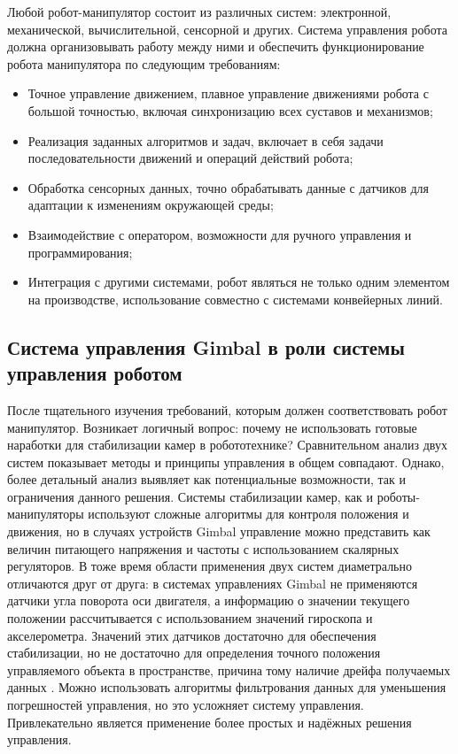 Любой робот-манипулятор состоит из различных систем: электронной, механической, вычислительной, сенсорной и других. Система управления робота должна организовывать работу между ними и обеспечить функционирование робота манипулятора по следующим требованиям:
\begin{itemize}
    \item Точное управление движением, плавное управление движениями робота с
        большой точностью, включая синхронизацию всех суставов и механизмов;

    \item Реализация заданных алгоритмов и задач, включает в себя задачи
        последовательности движений и операций действий робота;

    \item Обработка сенсорных данных, точно обрабатывать данные с датчиков для
        адаптации к изменениям окружающей среды;

    \item Взаимодействие с оператором, возможности для ручного управления и
        программирования;

    \item Интеграция с другими системами, робот являться не только одним
        элементом на производстве, использование совместно с системами конвейерных
        линий.
\end{itemize}

\subsection{Система управления Gimbal в роли системы управления роботом}

После тщательного изучения требований, которым должен соответствовать робот манипулятор. Возникает логичный вопрос: почему не использовать готовые наработки для стабилизации камер в робототехнике? Сравнительном анализ двух систем показывает методы и принципы управления в общем совпадают. Однако, более детальный анализ выявляет как потенциальные возможности, так и ограничения данного решения. Системы стабилизации камер, как и роботы-манипуляторы используют сложные алгоритмы для контроля положения и движения, но в случаях устройств Gimbal управление можно представить как величин питающего напряжения и частоты с использованием скалярных регуляторов. \citep{Altan2020} В тоже время области применения двух систем диаметрально отличаются друг от друга: в системах управлениях Gimbal не применяются датчики угла поворота оси двигателя, а информацию о значении текущего положении рассчитывается с использованием значений гироскопа и акселерометра. Значений этих датчиков достаточно для обеспечения стабилизации, но не достаточно для определения точного положения управляемого объекта в пространстве, причина тому наличие дрейфа получаемых данных \citep{1223234}.  Можно использовать алгоритмы фильтрования данных для уменьшения погрешностей управления, но это усложняет систему управления. Привлекательно является применение более простых и надёжных решения управления.

